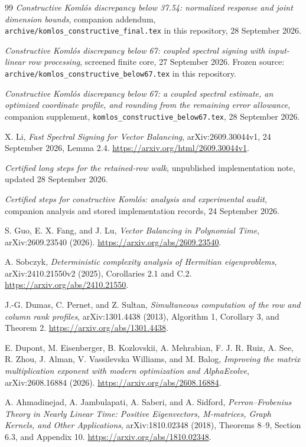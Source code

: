 \documentclass[11pt]{amsart}
\theoremstyle{definition}\newtheorem{definition}[theorem]{Definition}
\theoremstyle{remark}\newtheorem{remark}[theorem]{Remark}
\numberwithin{equation}{section}
\begin{document}
\begin{thebibliography}{99}
 \emph{Constructive Koml\'os discrepancy below 37.54:
normalized response and joint dimension bounds}, companion addendum,
\nolinkurl{archive/komlos_constructive_final.tex} in this repository,
28 September 2026.

 \emph{Constructive Koml\'os discrepancy below 67:
coupled spectral signing with input-linear row processing}, screened
finite core, 27 September 2026. Frozen source:
\nolinkurl{archive/komlos_constructive_below67.tex} in this repository.

 \emph{Constructive Koml\'os discrepancy below 67:
a coupled spectral estimate, an optimized coordinate profile, and rounding
from the remaining error allowance}, companion supplement,
\nolinkurl{komlos_constructive_below67.tex}, 28 September 2026.

 X. Li, \emph{Fast Spectral Signing for Vector Balancing},
arXiv:2609.30044v1, 24 September 2026, Lemma 2.4.
\url{https://arxiv.org/html/2609.30044v1}.

 \emph{Certified long steps for the retained-row walk},
unpublished implementation note, updated 28 September 2026.

 \emph{Certified steps for constructive Koml\'os:
analysis and experimental audit}, companion analysis and stored
implementation records, 24 September 2026.

 S. Guo, E. X. Fang, and J. Lu,
\emph{Vector Balancing in Polynomial Time}, arXiv:2609.23540 (2026).
\url{https://arxiv.org/abs/2609.23540}.

 A. Sobczyk,
\emph{Deterministic complexity analysis of Hermitian eigenproblems},
arXiv:2410.21550v2 (2025), Corollaries 2.1 and C.2.
\url{https://arxiv.org/abs/2410.21550}.

 J.-G. Dumas, C. Pernet, and Z. Sultan,
\emph{Simultaneous computation of the row and column rank profiles},
arXiv:1301.4438 (2013), Algorithm 1, Corollary 3, and Theorem 2.
\url{https://arxiv.org/abs/1301.4438}.

 E. Dupont, M. Eisenberger, B. Kozlovskii, A. Mehrabian,
F. J. R. Ruiz, A. See, R. Zhou, J. Alman, V. Vassilevska Williams,
and M. Balog, \emph{Improving the matrix multiplication exponent with
modern optimization and AlphaEvolve}, arXiv:2608.16884 (2026).
\url{https://arxiv.org/abs/2608.16884}.

 A. Ahmadinejad, A. Jambulapati, A. Saberi, and A. Sidford,
\emph{Perron--Frobenius Theory in Nearly Linear Time: Positive Eigenvectors,
M-matrices, Graph Kernels, and Other Applications}, arXiv:1810.02348 (2018),
Theorems 8--9, Section 6.3, and Appendix 10.
\url{https://arxiv.org/abs/1810.02348}.


\end{thebibliography}
\end{document}
